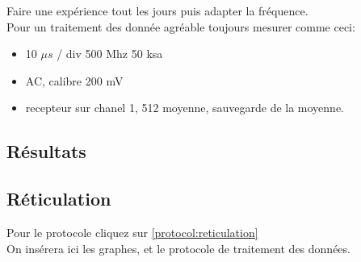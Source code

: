 Faire une expérience tout les jours puis adapter la fréquence.\\

Pour un traitement des donnée agréable toujours mesurer comme ceci:

\begin{itemize}
	\item 10 $\mu s$ / div 500 Mhz 50 ksa
	\item AC, calibre 200 mV
	\item recepteur sur chanel 1, 512 moyenne, sauvegarde de la moyenne. 
\end{itemize}


\subsection{Résultats}
\subsection{Réticulation}
\label{resultat:reticulation}
Pour le protocole cliquez sur \ref{protocol:reticulation}\\
On insérera ici les graphes, et le protocole de traitement des données. 
